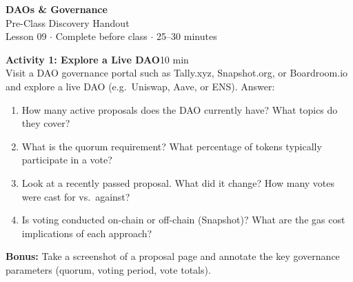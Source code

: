 \documentclass[11pt,a4paper]{article}
\newcommand{\activitybox}[3]{%
  \noindent\colorbox{mllavender4}{\parbox{\dimexpr\linewidth-2\fboxsep}{%
    \textbf{\color{mlpurple}#1}\hfill\textcolor{mlgray}{\small #2}\\[2pt]#3%
  }}\par\vspace{4pt}%
}
\begin{document}
\begin{center}
{\LARGE\color{mlpurple}\textbf{DAOs \& Governance}}\\[4pt]
{\large\color{mlblue}Pre-Class Discovery Handout}\\[2pt]
{\small\color{mlgray}Lesson 09 $\cdot$ Complete before class $\cdot$ 25--30 minutes}
\end{center}
\vspace{4pt}

\activitybox{Activity 1: Explore a Live DAO}{10 min}{%
Visit a DAO governance portal such as Tally.xyz, Snapshot.org, or Boardroom.io and explore a live DAO (e.g.\ Uniswap, Aave, or ENS). Answer:
\begin{enumerate}
\item How many active proposals does the DAO currently have? What topics do they cover?
\item What is the quorum requirement? What percentage of tokens typically participate in a vote?
\item Look at a recently passed proposal. What did it change? How many votes were cast for vs.\ against?
\item Is voting conducted on-chain or off-chain (Snapshot)? What are the gas cost implications of each approach?
\end{enumerate}
\textbf{Bonus:} Take a screenshot of a proposal page and annotate the key governance parameters (quorum, voting period, vote totals).
}

\vspace{2pt}
\end{document}
